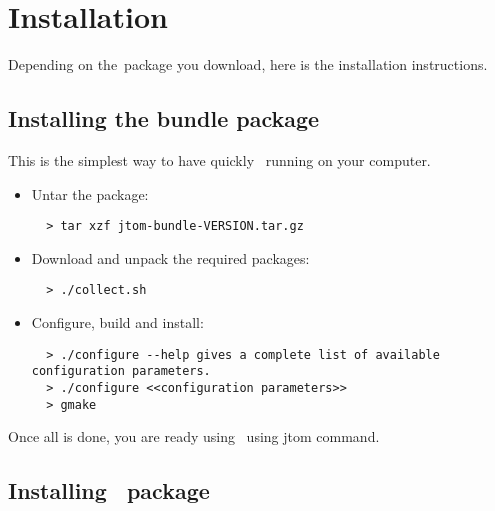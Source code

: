 \section{Installation}
Depending on the\TOM\ package you download, here is the installation
instructions.

\subsection{Installing the bundle package}
This is the simplest way to have quickly \TOM\ running on your
computer.
\begin{itemize}
\item Untar the package:
\begin{verbatim}
  > tar xzf jtom-bundle-VERSION.tar.gz
\end{verbatim}
\item Download and unpack the required packages:
\begin{verbatim}
  > ./collect.sh
\end{verbatim}
\item Configure, build and install:
\begin{verbatim}
  > ./configure --help gives a complete list of available configuration parameters.
  > ./configure <<configuration parameters>>
  > gmake
\end{verbatim}
\end{itemize}

Once all is done, you are ready using \TOM\ using jtom command.

\subsection{Installing \TOM\ package}

